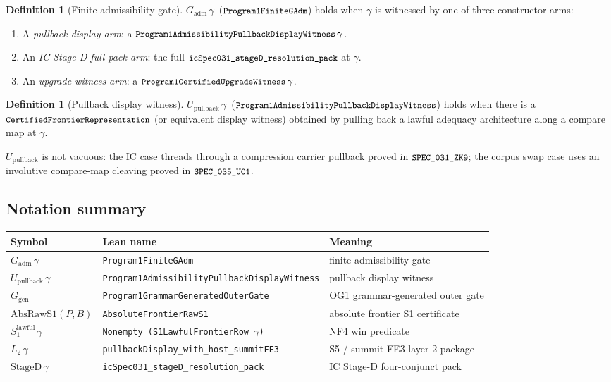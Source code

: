 \documentclass[11pt]{article}
\theoremstyle{plain}
\theoremstyle{definition}
\newtheorem{definition}[theorem]{Definition}
\newcommand{\Gadm}{G_{\mathrm{adm}}}
\newcommand{\Upb}{U_{\mathrm{pullback}}}
\newcommand{\Ggen}{G_{\mathrm{gen}}}
\newcommand{\AbsRawSone}{\mathrm{AbsRawS1}}
\newcommand{\Stwo}{L_2}
\newcommand{\StageD}{\mathrm{StageD}}
\newcommand{\SoneLawful}{S_1^{\mathrm{lawful}}}
\newcommand{\lean}[1]{\texttt{\small #1}}
\begin{document}
\begin{definition}[Finite admissibility gate]
  $\Gadm\,\gamma$\, ($\lean{Program1FiniteGAdm}$) holds when $\gamma$ is
  witnessed by one of three constructor arms:
  \begin{enumerate}
    \item A \emph{pullback display arm}: a
      $\lean{Program1AdmissibilityPullbackDisplayWitness}\,\gamma$.
    \item An \emph{IC Stage-D full pack arm}: the full
      $\lean{icSpec031\_stageD\_resolution\_pack}$ at $\gamma$.
    \item An \emph{upgrade witness arm}: a
      $\lean{Program1CertifiedUpgradeWitness}\,\gamma$.
  \end{enumerate}
\end{definition}

\begin{definition}[Pullback display witness]
  $\Upb\,\gamma$\, ($\lean{Program1AdmissibilityPullbackDisplayWitness}$)
  holds when there is a $\lean{CertifiedFrontierRepresentation}$ (or
  equivalent display witness) obtained by pulling back a lawful adequacy
  architecture along a compare map at $\gamma$.
\end{definition}

\noindent
$\Upb$ is not vacuous: the IC case threads through a compression carrier
pullback proved in $\lean{SPEC\_031\_ZK9}$; the corpus swap case uses an
involutive compare-map cleaving proved in $\lean{SPEC\_035\_UC1}$.

\subsection{Notation summary}

\begin{center}
\begin{tabular}{lll}
\hline
Symbol & Lean name & Meaning \\
\hline
$\Gadm\,\gamma$ & \lean{Program1FiniteGAdm} & finite admissibility gate \\
$\Upb\,\gamma$ & \lean{Program1AdmissibilityPullbackDisplayWitness} & pullback display witness \\
$\Ggen$ & \lean{Program1GrammarGeneratedOuterGate} & OG1 grammar-generated outer gate \\
$\AbsRawSone(P,B)$ & \lean{AbsoluteFrontierRawS1} & absolute frontier S1 certificate \\
$\SoneLawful\,\gamma$ & \lean{Nonempty (S1LawfulFrontierRow $\gamma$)} & NF4 win predicate \\
$\Stwo\,\gamma$ & \lean{pullbackDisplay\_with\_host\_summitFE3} & S5 / summit-FE3 layer-2 package \\
$\StageD\,\gamma$ & \lean{icSpec031\_stageD\_resolution\_pack} & IC Stage-D four-conjunct pack \\
\hline
\end{tabular}
\end{center}
\end{document}
